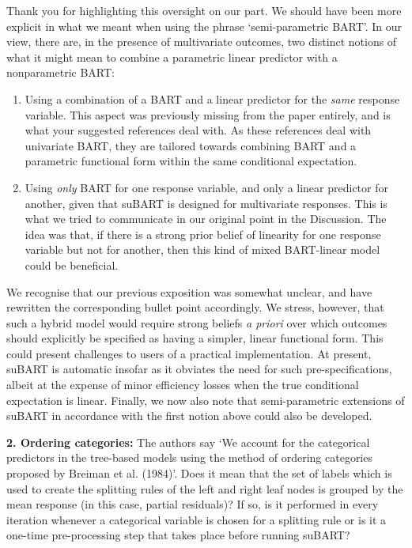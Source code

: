 \documentclass{article}
\begin{document}
Thank you for highlighting this oversight on our part. We should have been more explicit in what we meant when using the phrase `semi-parametric BART'. In our view, there are, in the presence of multivariate outcomes, two distinct notions of what it might mean to combine a parametric linear predictor with a nonparametric BART:
\begin{enumerate}
    \item Using a combination of a BART and a linear predictor for the \emph{same} response variable. This aspect was previously missing from the paper entirely, and is what your suggested references deal with. As these references deal with univariate BART, they are tailored towards combining BART and a parametric functional form within the same conditional expectation.
    \item Using \emph{only} BART for one response variable, and only a linear predictor for another, given that suBART is designed for multivariate responses. This is what we tried to communicate in our original point in the Discussion. The idea was that, if there is a strong prior belief of linearity for one response variable but not for another, then this kind of mixed BART-linear model could be beneficial.
\end{enumerate}
We recognise that our previous exposition was somewhat unclear, and have rewritten the corresponding bullet point accordingly. We stress, however, that such a hybrid model would require strong beliefs \emph{a priori} over which outcomes should explicitly be specified as having a simpler, linear functional form. This could present challenges to users of a practical implementation. At present, suBART is automatic insofar as it obviates the need for such pre-specifications, albeit at the expense of minor efficiency losses when the true conditional expectation is linear. Finally, we now also note that semi-parametric extensions of suBART in accordance with the first notion above could also be developed.

\begin{mdframed}
  \textbf{2. Ordering categories:} The authors say `We account for the categorical predictors in the tree-based models using the method of ordering categories proposed by Breiman et al. (1984)'. Does it mean that the set of labels which is used to create the splitting rules of the left and right leaf nodes is grouped by the mean response (in this case, partial residuals)? If so, is it performed in every iteration whenever a categorical variable is chosen for a splitting rule or is it a one-time pre-processing step that takes place before running suBART?
\end{mdframed}
\end{document}
